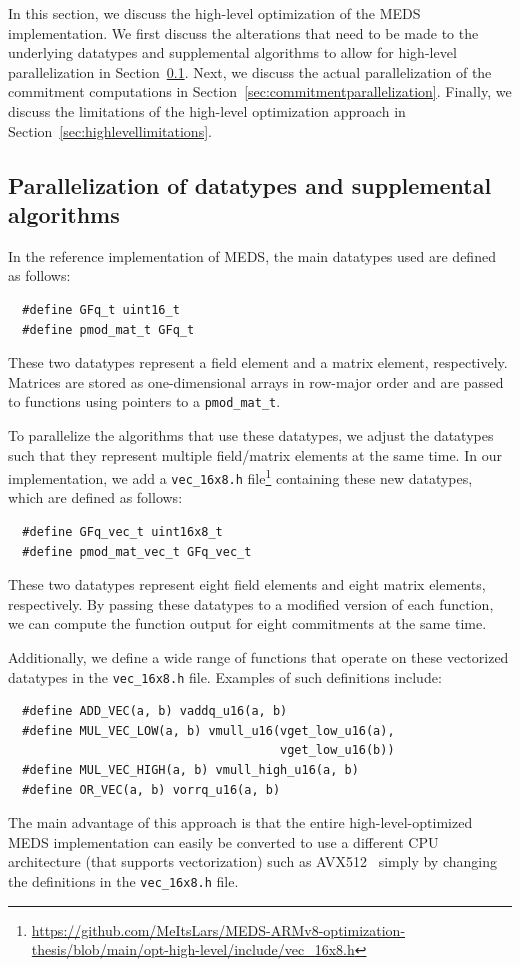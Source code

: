 \documentclass[11pt,a4paper]{report}
\theoremstyle{definition}
\begin{document}
In this section, we discuss the high-level optimization of the MEDS implementation. We first discuss the alterations that need to be made to the underlying datatypes and supplemental algorithms to allow for high-level parallelization in Section~\ref{sec:highleveldataalgorithms}. Next, we discuss the actual parallelization of the commitment computations in Section~\ref{sec:commitmentparallelization}. Finally, we discuss the limitations of the high-level optimization approach in Section~\ref{sec:highlevellimitations}.

\subsection{Parallelization of datatypes and supplemental algorithms}
\label{sec:highleveldataalgorithms}
In the reference implementation of MEDS, the main datatypes used are defined as follows:
\begin{samepage}
  \begin{verbatim}
  #define GFq_t uint16_t
  #define pmod_mat_t GFq_t
\end{verbatim}
\end{samepage}
These two datatypes represent a field element and a matrix element, respectively. Matrices are stored as one-dimensional arrays in row-major order and are passed to functions using pointers to a \texttt{pmod\_mat\_t}.

To parallelize the algorithms that use these datatypes, we adjust the datatypes such that they represent multiple field/matrix elements at the same time. In our implementation, we add a \texttt{vec\_16x8.h} file\footnote{\url{https://github.com/MeItsLars/MEDS-ARMv8-optimization-thesis/blob/main/opt-high-level/include/vec\_16x8.h}} containing these new datatypes, which are defined as follows:
\begin{samepage}
  \begin{verbatim}
  #define GFq_vec_t uint16x8_t
  #define pmod_mat_vec_t GFq_vec_t
\end{verbatim}
\end{samepage}
These two datatypes represent eight field elements and eight matrix elements, respectively. By passing these datatypes to a modified version of each function, we can compute the function output for eight commitments at the same time.

Additionally, we define a wide range of functions that operate on these vectorized datatypes in the \texttt{vec\_16x8.h} file. Examples of such definitions include:
\begin{samepage}
  \begin{verbatim}
  #define ADD_VEC(a, b) vaddq_u16(a, b)
  #define MUL_VEC_LOW(a, b) vmull_u16(vget_low_u16(a), 
                                      vget_low_u16(b))
  #define MUL_VEC_HIGH(a, b) vmull_high_u16(a, b)
  #define OR_VEC(a, b) vorrq_u16(a, b)
\end{verbatim}
\end{samepage}
The main advantage of this approach is that the entire high-level-optimized MEDS implementation can easily be converted to use a different CPU architecture (that supports vectorization) such as AVX512~\cite{intel-avx512} simply by changing the definitions in the \texttt{vec\_16x8.h} file.
\end{document}
